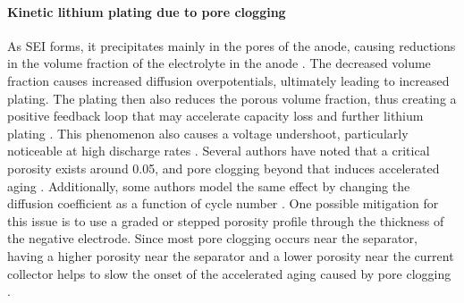 \documentclass[journal=jpcl, manuscript=article, layout=onecolumn]{achemso}
\begin{document}
\paragraph{Kinetic lithium plating due to pore clogging}
As SEI forms, it precipitates mainly in the pores of the anode, causing reductions in the volume fraction of the electrolyte in the anode \cite{sikha_effect_2004}. The decreased volume fraction causes increased diffusion overpotentials, ultimately leading to increased plating. The plating then also reduces the porous volume fraction, thus creating a positive feedback loop that may accelerate capacity loss and further lithium plating \cite{yang_modeling_2017}. This phenomenon also causes a voltage undershoot, particularly noticeable at high discharge rates \cite{yang_modeling_2017}. Several authors have noted that a critical porosity exists around 0.05, and pore clogging beyond that induces accelerated aging \cite{yang_modeling_2017, muller_model-based_2019}. Additionally, some authors model the same effect by changing the diffusion coefficient as a function of cycle number \cite{keil_electrochemical_2020}. One possible mitigation for this issue is to use a graded or stepped porosity profile through the thickness of the negative electrode. Since most pore clogging occurs near the separator, having a higher porosity near the separator and a lower porosity near the current collector helps to slow the onset of the accelerated aging caused by pore clogging \cite{muller_model-based_2019}.
\end{document}
